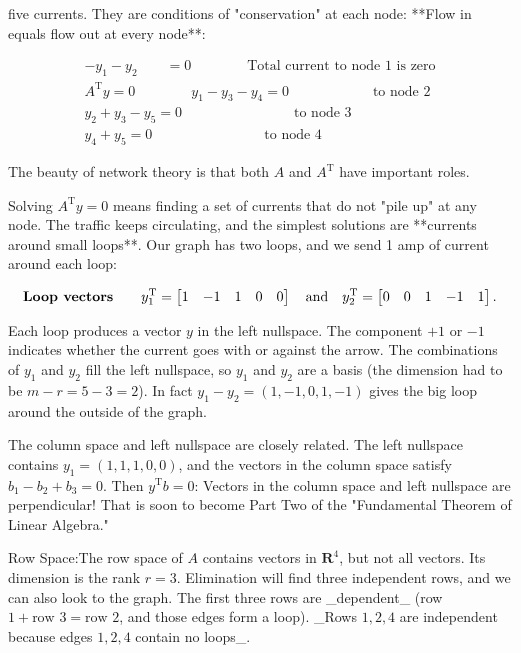 five currents. They are conditions of "conservation" at each node: **Flow in equals flow out at every node**:

\[\begin{array}{c}-y_{1}-y_{2}\qquad=0\qquad\qquad\text{Total current to node 1 is zero}\\ A^{\text{T}}y=0\qquad\qquad y_{1}-y_{3}-y_{4}=0\qquad\qquad\qquad\text{to node 2}\\ y_{2}+y_{3}-y_{5}=0\qquad\qquad\qquad\qquad\text{to node 3}\\ y_{4}+y_{5}=0\qquad\qquad\qquad\qquad\text{to node 4}\end{array}\]

The beauty of network theory is that both \(A\) and \(A^{\text{T}}\) have important roles.

Solving \(A^{\text{T}}y=0\) means finding a set of currents that do not "pile up" at any node. The traffic keeps circulating, and the simplest solutions are **currents around small loops**. Our graph has two loops, and we send 1 amp of current around each loop:

\[\text{\bf Loop vectors}\qquad y_{1}^{\text{T}}=\begin{bmatrix}1&-1&1&0&0\end{bmatrix} \quad\text{and}\quad y_{2}^{\text{T}}=\begin{bmatrix}0&0&1&-1&1\end{bmatrix}.\]

Each loop produces a vector \(y\) in the left nullspace. The component \(+1\) or \(-1\) indicates whether the current goes with or against the arrow. The combinations of \(y_{1}\) and \(y_{2}\) fill the left nullspace, so \(y_{1}\) and \(y_{2}\) are a basis (the dimension had to be \(m-r=5-3=2\)). In fact \(y_{1}-y_{2}=(1,-1,0,1,-1)\) gives the big loop around the outside of the graph.

The column space and left nullspace are closely related. The left nullspace contains \(y_{1}=(1,1,1,0,0)\), and the vectors in the column space satisfy \(b_{1}-b_{2}+b_{3}=0\). Then \(y^{\text{T}}b=0\): Vectors in the column space and left nullspace are perpendicular! That is soon to become Part Two of the "Fundamental Theorem of Linear Algebra."

Row Space:The row space of \(A\) contains vectors in \(\mathbf{R}^{4}\), but not all vectors. Its dimension is the rank \(r=3\). Elimination will find three independent rows, and we can also look to the graph. The first three rows are _dependent_ (row \(1+\text{row }3=\text{row }2\), and those edges form a loop). _Rows \(1,2,4\) are independent because edges \(1,2,4\) contain no loops_.

